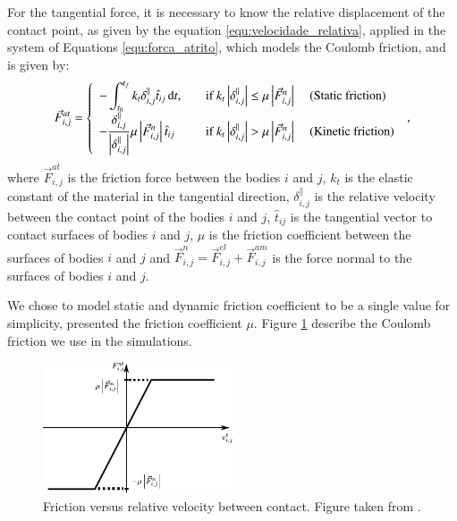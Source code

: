     For the tangential force, it is necessary to know the relative displacement of the contact point, as given by the equation \ref{equ:velocidade_relativa}, applied in the system of Equations \ref{equ:forca_atrito}, which models the Coulomb friction, and is given by:
\begin{equation}
    \label{equ:forca_atrito}
    \vec{F}_{i,j}^{at} = \left\{
    \begin{array}{l l l}
        \displaystyle -\int_{t_{0}}^{t_{f}} k_{t} \delta_{i,j}^{\parallel} \hat{t}_{ij}\, \mathrm{d} t, & \quad \textrm{if } k_{t} \left| \delta_{i,j}^{\parallel} \right| \leq \mu \left|\vec{F}_{i,j}^{n}\right| & \textrm{ (Static friction)} \\
        \displaystyle -\frac{\delta_{i,j}^{\parallel}}{\left|\delta_{i,j}^{\parallel}\right|} \mu \left| \vec{F}_{i,j}^{n} \right| \hat{t}_{ij}\, & \quad \textrm{if } k_{t} \left| \delta_{i,j}^{\parallel} \right| > \mu \left| \vec{F}_{i,j}^{n} \right| & \textrm{ (Kinetic friction)}
    \end{array}
    \right.\ ,
\end{equation}
where $\vec{F}_{i,j}^{at}$ is the friction force between the bodies $i$ and $j$, $k_{t}$ is the elastic constant of the material in the tangential direction, $\delta_{i,j}^{\parallel}$ is the relative velocity between the contact point of the bodies $i$ and $j$, $\hat{t}_{ij}$ is the tangential vector to contact surfaces of bodies $i$ and $j$, $\mu$ is the friction coefficient between the surfaces of bodies $i$ and $j$ and $\vec{F}_{i,j}^{n} = \vec{F}_{i,j}^{el} +\vec{F}_{i,j}^{am}$ is the force normal to the surfaces of bodies $i$ and $j$.

    We chose to model static and dynamic friction coefficient to be a single value for simplicity, presented the friction coefficient $\mu$. Figure \ref{fig:atrito} describe the Coulomb friction we use in the simulations.

\begin{figure}
    \centering
    \includegraphics[width=0.5\textwidth]{04-figuras/Atrito.pdf}
    \caption[Friction.]{Friction versus relative velocity between contact. Figure taken from \cite{Caio-Tese}.}
    \label{fig:atrito}
\end{figure}

